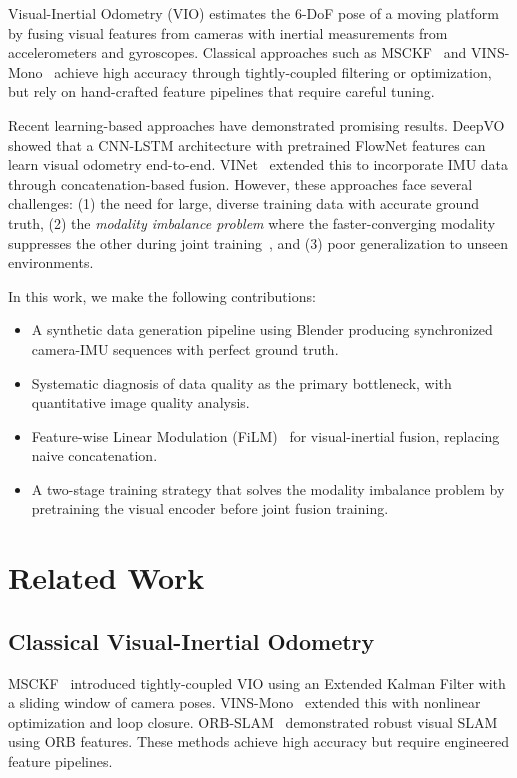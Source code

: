 \documentclass[conference]{IEEEtran}
\begin{document}
Visual-Inertial Odometry (VIO) estimates the 6-DoF pose of a moving platform by fusing visual features from cameras with inertial measurements from accelerometers and gyroscopes. Classical approaches such as MSCKF~\cite{mourikis2007} and VINS-Mono~\cite{qin2018} achieve high accuracy through tightly-coupled filtering or optimization, but rely on hand-crafted feature pipelines that require careful tuning.

Recent learning-based approaches have demonstrated promising results. DeepVO~\cite{wang2017} showed that a CNN-LSTM architecture with pretrained FlowNet features can learn visual odometry end-to-end. VINet~\cite{clark2017} extended this to incorporate IMU data through concatenation-based fusion. However, these approaches face several challenges: (1) the need for large, diverse training data with accurate ground truth, (2) the \textit{modality imbalance problem} where the faster-converging modality suppresses the other during joint training~\cite{wang2020multimodal}, and (3) poor generalization to unseen environments.

In this work, we make the following contributions:
\begin{itemize}
    \item A synthetic data generation pipeline using Blender producing synchronized camera-IMU sequences with perfect ground truth.
    \item Systematic diagnosis of data quality as the primary bottleneck, with quantitative image quality analysis.
    \item Feature-wise Linear Modulation (FiLM)~\cite{perez2018} for visual-inertial fusion, replacing naive concatenation.
    \item A two-stage training strategy that solves the modality imbalance problem by pretraining the visual encoder before joint fusion training.
\end{itemize}

\section{Related Work}

\subsection{Classical Visual-Inertial Odometry}
MSCKF~\cite{mourikis2007} introduced tightly-coupled VIO using an Extended Kalman Filter with a sliding window of camera poses. VINS-Mono~\cite{qin2018} extended this with nonlinear optimization and loop closure. ORB-SLAM~\cite{mur2015} demonstrated robust visual SLAM using ORB features. These methods achieve high accuracy but require engineered feature pipelines.
\end{document}

